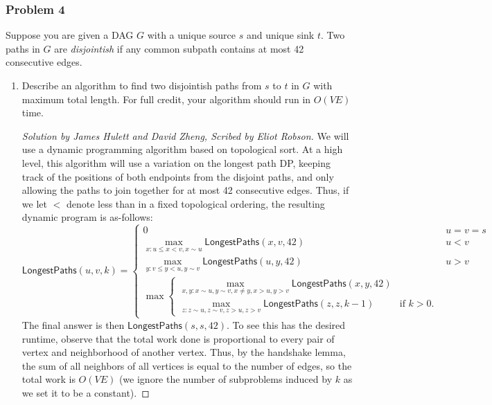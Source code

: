 \documentclass{article}
\newenvironment{scribed}[2]{\begin{proof}[Solution by #1, Scribed by #2]}{\end{proof}}
\begin{document}
\subsubsection{Problem 4}
Suppose you are given a DAG \(G\) with a unique source \(s\) and unique sink \(t\). Two paths in \(G\) are \emph{disjointish} if any common subpath contains at most 42 consecutive edges.

\begin{enumerate}
	\item Describe an algorithm to find two disjointish paths from \(s\) to \(t\) in \(G\) with maximum total length. For full credit, your algorithm should run in \(O(VE)\) time. %
    
    \begin{scribed}{James Hulett and David Zheng}{Eliot Robson}
        We will use a dynamic programming algorithm based on topological sort. At a high level, this algorithm will use a variation on the longest path DP, keeping track of the positions of both endpoints from the disjoint paths, and only allowing the paths to join together for at most 42 consecutive edges. Thus, if we let \(<\) denote less than in a fixed topological ordering, the resulting dynamic program is as-follows:
        \[
            \mathsf{LongestPaths}(u,v,k)
            =%
            \begin{cases}
                0 &u = v = s\\
                \max_{x : u \leq x < v, x \sim u} \mathsf{LongestPaths}(x,v,42)
                &u < v\\
                \max_{y : v \leq y < u, y \sim v} \mathsf{LongestPaths}(u,y,42)
                &u > v\\
                \max \begin{cases}
                    \max\limits_{x,y : x \sim u, y \sim v, x \neq y, x > u, y > v} \mathsf{LongestPaths}(x,y,42)\\
                    \max\limits_{z : z \sim u, z \sim v, z > u, z > v} \mathsf{LongestPaths}(z,z,k-1)
                    &\text{if } k > 0.
                \end{cases}
            \end{cases}
        \]
        The final answer is then \(\mathsf{LongestPaths}(s,s,42)\). To see this has the desired runtime, observe that the total work done is proportional to every pair of vertex and neighborhood of another vertex. Thus, by the handshake lemma, the sum of all neighbors of all vertices is equal to the number of edges, so the total work is \(O(VE)\) (we ignore the number of subproblems induced by \(k\) as we set it to be a constant).
    \end{scribed}
    

\end{enumerate}
\end{document}
